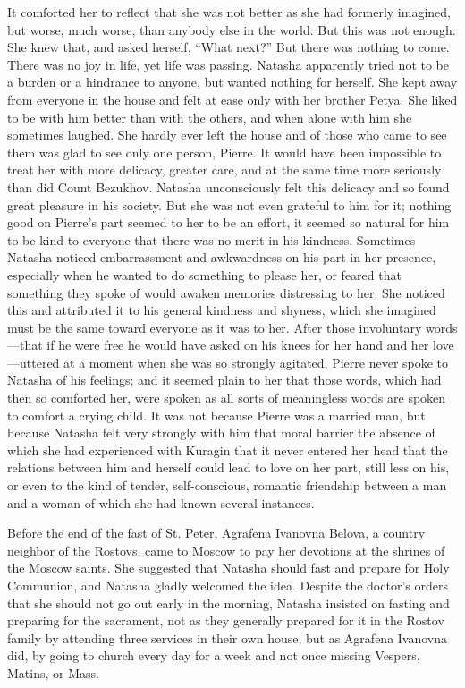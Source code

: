 It comforted her to reflect that she was not better as she had
formerly imagined, but worse, much worse, than anybody else in
the world. But this was not enough. She knew that, and asked
herself, ``What next?'' But there was nothing to come. There was
no joy in life, yet life was passing. Natasha apparently tried
not to be a burden or a hindrance to anyone, but wanted nothing
for herself. She kept away from everyone in the house and felt at
ease only with her brother Petya. She liked to be with him better
than with the others, and when alone with him she sometimes
laughed. She hardly ever left the house and of those who came to
see them was glad to see only one person, Pierre. It would have
been impossible to treat her with more delicacy, greater care,
and at the same time more seriously than did Count
Bezukhov. Natasha unconsciously felt this delicacy and so found
great pleasure in his society. But she was not even grateful to
him for it; nothing good on Pierre's part seemed to her to be an
effort, it seemed so natural for him to be kind to everyone that
there was no merit in his kindness. Sometimes Natasha noticed
embarrassment and awkwardness on his part in her presence,
especially when he wanted to do something to please her, or
feared that something they spoke of would awaken memories
distressing to her. She noticed this and attributed it to his
general kindness and shyness, which she imagined must be the same
toward everyone as it was to her.  After those involuntary
words---that if he were free he would have asked on his knees for
her hand and her love---uttered at a moment when she was so
strongly agitated, Pierre never spoke to Natasha of his feelings;
and it seemed plain to her that those words, which had then so
comforted her, were spoken as all sorts of meaningless words are
spoken to comfort a crying child. It was not because Pierre was a
married man, but because Natasha felt very strongly with him that
moral barrier the absence of which she had experienced with
Kuragin that it never entered her head that the relations between
him and herself could lead to love on her part, still less on
his, or even to the kind of tender, self-conscious, romantic
friendship between a man and a woman of which she had known
several instances.

Before the end of the fast of St. Peter, Agrafena Ivanovna
Belova, a country neighbor of the Rostovs, came to Moscow to pay
her devotions at the shrines of the Moscow saints. She suggested
that Natasha should fast and prepare for Holy Communion, and
Natasha gladly welcomed the idea.  Despite the doctor's orders
that she should not go out early in the morning, Natasha insisted
on fasting and preparing for the sacrament, not as they generally
prepared for it in the Rostov family by attending three services
in their own house, but as Agrafena Ivanovna did, by going to
church every day for a week and not once missing Vespers, Matins,
or Mass.


